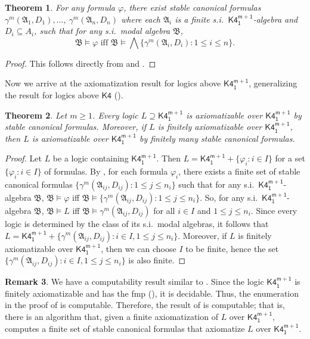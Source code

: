 \documentclass[a4paper,11pt]{article}
\newtheorem{theorem}{Theorem}
\theoremstyle{definition}
\newtheorem{remark}[theorem]{Remark}
\theoremstyle{remark}
\numberwithin{theorem}{section}
\newcommand{\alg}[1]{\mathfrak{#1}}
\newcommand{\A}{\alg{A}}
\newcommand{\B}{\alg{B}}
\newcommand{\logic}[1]{\mathsf{#1}}
\newcommand{\Kf}{\logic{K4}}
\newcommand{\Kff}[2]{\logic{K4^{#1}_{#2}}}
\renewcommand{\phi}{\varphi}
\newcommand{\Land}{\bigwedge}
\begin{document}
\begin{theorem} \label{3: Thm scf complete}
    For any formula $\phi$, there exist stable canonical formulas $\gamma^m(\A_1, D_1), \dots$, $\gamma^m(\A_n, D_n)$ where each $\A_i$ is a finite s.i.~$\Kff{m+1}{1}$-algebra and $D_i \subseteq A_i$, such that for any s.i.~modal algebra $\B$, 
    \[\B \models \phi \text{ iff } \B \models \Land \{\gamma^m(\A_i, D_i): 1 \leq i \leq n\}.\]
\end{theorem}

\begin{proof}
    This follows directly from  and .
\end{proof}

Now we arrive at the axiomatization result for logics above $\Kff{m+1}{1}$, generalizing the result for logics above $\Kf$ (\cite[Theorem 6.10]{stablecanonicalrules}).

\begin{theorem} \label{3: Thm scf complete 2}
    Let $m \geq 1$. Every logic $L \supseteq \Kff{m+1}{1}$ is axiomatizable over $\Kff{m+1}{1}$ by stable canonical formulas. Moreover, if $L$ is finitely axiomatizable over $\Kff{m+1}{1}$, then $L$ is axiomatizable over $\Kff{m+1}{1}$ by finitely many stable canonical formulas.
\end{theorem}

\begin{proof}
    Let $L$ be a logic containing $\Kff{m+1}{1}$. Then $L = \Kff{m+1}{1} + \{\phi_i: i \in I\}$ for a set $\{\phi_i: i \in I\}$ of formulas. By , for each formula $\phi_i$, there exists a finite set of stable canonical formulas $\{\gamma^m(\A_{ij}, D_{ij}): 1 \leq j \leq n_i\}$ such that for any s.i.~$\Kff{m+1}{1}$-algebra $\B$, $\B \models \phi$ iff $\B \models \{\gamma^m(\A_{ij}, D_{ij}): 1 \leq j \leq n_i\}$. So, for any s.i.~$\Kff{m+1}{1}$-algebra $\B$, $\B \models L$ iff $\B \models \gamma^m(\A_{ij}, D_{ij})$ for all $i \in I$ and $1 \leq j \leq n_i$. Since every logic is determined by the class of its s.i.~modal algebras, it follows that $L = \Kff{m+1}{1} + \{\gamma^m(\A_{ij}, D_{ij}): i \in I, 1 \leq j \leq n_i\}$. Moreover, if $L$ is finitely axiomatizable over $\Kff{m+1}{1}$, then we can choose $I$ to be finite, hence the set $\{\gamma^m(\A_{ij}, D_{ij}): i \in I, 1 \leq j \leq n_i\}$ is also finite.  
\end{proof}

\begin{remark} \label{3: Rem before jankov fml}
    We have a computability result similar to . Since the logic $\Kff{m+1}{1}$ is finitely axiomatizable and has the fmp (), it is decidable. Thus, the enumeration in the proof of  is computable. Therefore, the result of  is computable; that is, there is an algorithm that, given a finite axiomatization of $L$ over $\Kff{m+1}{1}$, computes a finite set of stable canonical formulas that axiomatize $L$ over $\Kff{m+1}{1}$. 
\end{remark}
\end{document}
